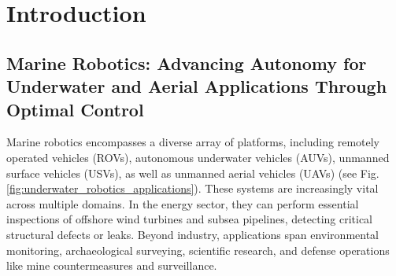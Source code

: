 \chapter{Introduction}















\section{Marine Robotics: Advancing Autonomy for Underwater and Aerial Applications Through Optimal Control}

Marine robotics encompasses a diverse array of platforms, including remotely operated vehicles (ROVs), autonomous underwater vehicles (AUVs), unmanned surface vehicles (USVs), as well as unmanned aerial vehicles (UAVs) (see Fig. \ref{fig:underwater_robotics_applications}). These systems are increasingly vital across multiple domains. In the energy sector, they can perform essential inspections of offshore wind turbines and subsea pipelines, detecting critical structural defects or leaks. Beyond industry, applications span environmental monitoring, archaeological surveying, scientific research, and defense operations like mine countermeasures and surveillance.


